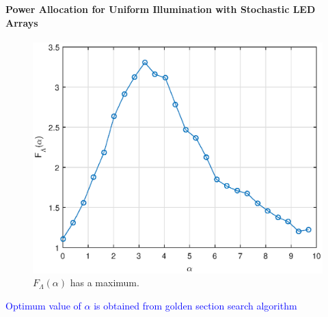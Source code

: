 \documentclass[slidestop,usepdftitle=false]{gvvslides}
\begin{document}
\begin{frame}
\frametitle{\,}
\framesubtitle{Power Allocation for Uniform Illumination with
Stochastic LED Arrays}
   \begin{figure}[!h]
        \centering
        \includegraphics[width=.6\columnwidth]{QvsAlpha}
        \caption{$F_{\Lambda}(\alpha)$ has a maximum.}
	\label{fig:qconcave}
    \end{figure}
    \textcolor{blue}{Optimum value of $\alpha$ is obtained from golden section search algorithm}
\end{frame}
\end{document}
